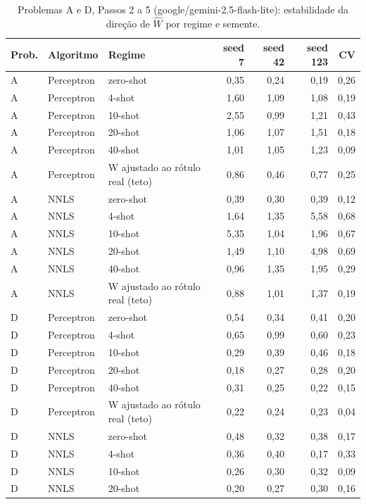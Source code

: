\begin{table}[htbp]
\centering
\small
\caption{Problemas A e D, Passos 2 a 5 (google/gemini-2.5-flash-lite): estabilidade da direção de $\hat{W}$ por regime e semente.}
\label{tab:AD_passo4_estabilidade_W_flashlite}
\begin{tabular}{lllrrrr}
\toprule
Prob. & Algoritmo & Regime & seed 7 & seed 42 & seed 123 & CV \\
\midrule
A & Perceptron & zero-shot & 0,35 & 0,24 & 0,19 & 0,26 \\
A & Perceptron & 4-shot & 1,60 & 1,09 & 1,08 & 0,19 \\
A & Perceptron & 10-shot & 2,55 & 0,99 & 1,21 & 0,43 \\
A & Perceptron & 20-shot & 1,06 & 1,07 & 1,51 & 0,18 \\
A & Perceptron & 40-shot & 1,01 & 1,05 & 1,23 & 0,09 \\
A & Perceptron & W ajustado ao rótulo real (teto) & 0,86 & 0,46 & 0,77 & 0,25 \\
\midrule
A & NNLS & zero-shot & 0,39 & 0,30 & 0,39 & 0,12 \\
A & NNLS & 4-shot & 1,64 & 1,35 & 5,58 & 0,68 \\
A & NNLS & 10-shot & 5,35 & 1,04 & 1,96 & 0,67 \\
A & NNLS & 20-shot & 1,49 & 1,10 & 4,98 & 0,69 \\
A & NNLS & 40-shot & 0,96 & 1,35 & 1,95 & 0,29 \\
A & NNLS & W ajustado ao rótulo real (teto) & 0,88 & 1,01 & 1,37 & 0,19 \\
\midrule
D & Perceptron & zero-shot & 0,54 & 0,34 & 0,41 & 0,20 \\
D & Perceptron & 4-shot & 0,65 & 0,99 & 0,60 & 0,23 \\
D & Perceptron & 10-shot & 0,29 & 0,39 & 0,46 & 0,18 \\
D & Perceptron & 20-shot & 0,18 & 0,27 & 0,28 & 0,20 \\
D & Perceptron & 40-shot & 0,31 & 0,25 & 0,22 & 0,15 \\
D & Perceptron & W ajustado ao rótulo real (teto) & 0,22 & 0,24 & 0,23 & 0,04 \\
\midrule
D & NNLS & zero-shot & 0,48 & 0,32 & 0,38 & 0,17 \\
D & NNLS & 4-shot & 0,36 & 0,40 & 0,17 & 0,33 \\
D & NNLS & 10-shot & 0,26 & 0,30 & 0,32 & 0,09 \\
D & NNLS & 20-shot & 0,20 & 0,27 & 0,30 & 0,16 \\

\end{tabular}
\end{table}

